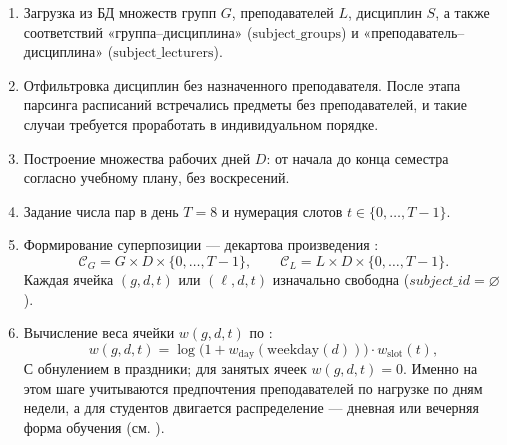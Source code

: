\begin{enumerate}
	\item Загрузка из БД множеств групп $G$, преподавателей $L$, дисциплин $S$,
	а также соответствий «группа--дисциплина» ($\mathrm{subject\_groups}$) и
	«преподаватель--дисциплина» ($\mathrm{subject\_lecturers}$).

	\item Отфильтровка дисциплин без назначенного преподавателя.
	После этапа парсинга расписаний встречались предметы без преподавателей,
	и такие случаи требуется проработать в индивидуальном порядке.

	\item Построение множества рабочих дней $D$:
	от начала до конца семестра согласно учебному плану, без воскресений.

	\item Задание числа пар в день $T=8$ и нумерация слотов
	$t \in \{0,\ldots,T-1\}$.

	\item Формирование суперпозиции --- декартова произведения :
	\begin{equation}
		\mathcal{C}_G = G \times D \times \{0,\ldots,T-1\}, \qquad
		\mathcal{C}_L = L \times D \times \{0,\ldots,T-1\}.
		\label{eq:wfc-superposition}
	\end{equation}
	Каждая ячейка $(g,d,t)$ или $(\ell,d,t)$ изначально свободна
	($subject\_id=\varnothing$).

	\item Вычисление веса ячейки $w(g,d,t)$ по :
	\begin{equation}
		w(g,d,t)=\log\!\bigl(1+w_{\mathrm{day}}(\mathrm{weekday}(d))\bigr)\cdot
		w_{\mathrm{slot}}(t),
		\label{eq:wfc-weight}
	\end{equation}
	С обнулением в праздники; для занятых ячеек $w(g,d,t)=0$. Именно на этом шаге учитываются предпочтения преподавателей по нагрузке по дням недели, а для студентов двигается распределение --- дневная или вечерняя форма обучения (см. ).


\end{enumerate}
